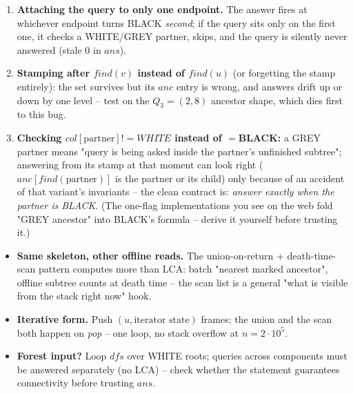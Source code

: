 \begin{warningbox}
\begin{enumerate}[nosep,leftmargin=1.6em]
  \item \textbf{Attaching the query to only one endpoint.} The answer fires at
        whichever endpoint turns BLACK \emph{second}; if the query sits only on
        the first one, it checks a WHITE/GREY partner, skips, and the query is
        silently never answered (stale \(0\) in \(\mathit{ans}\)).
  \item \textbf{Stamping after \(\mathit{find}(v)\) instead of \(\mathit{find}(u)\)}
        (or forgetting the stamp entirely): the set survives but its
        \(\mathit{anc}\) entry is wrong, and answers drift up or down by one
        level -- test on the \(Q_3=(2,8)\) ancestor shape, which dies first to
        this bug.
  \item \textbf{Checking \(\mathit{col}[\text{partner}] != \mathit{WHITE}\) instead
        of \(=\)BLACK:} a GREY partner means "query is being asked inside the
        partner's unfinished subtree"; answering from its stamp at that moment
        can look right (\(\mathit{anc}[\mathit{find}(\text{partner})]\) is the
        partner or its child) only because of an accident of that variant's
        invariants -- the clean contract is: \emph{answer exactly when the
        partner is BLACK}.  (The one-flag implementations you see on the web
        fold "GREY ancestor" into BLACK's formula -- derive it yourself before
        trusting it.)
\end{enumerate}
\end{warningbox}

\begin{hardeningbox}
\begin{itemize}[nosep,leftmargin=1.4em]
  \item \textbf{Same skeleton, other offline reads.} The union-on-return +
        death-time-scan pattern computes more than LCA: batch "nearest marked
        ancestor", offline subtree counts at death time -- the scan list is a
        general "what is visible from the stack right now" hook.
  \item \textbf{Iterative form.} Push \((u,\text{iterator state})\) frames; the
        union and the scan both happen on \emph{pop} -- one loop, no stack
        overflow at \(n=2\cdot10^5\).
  \item \textbf{Forest input?} Loop \(\mathit{dfs}\) over WHITE roots; queries
        across components must be answered separately (no LCA) -- check whether
        the statement guarantees connectivity before trusting \(\mathit{ans}\).
\end{itemize}
\end{hardeningbox}

